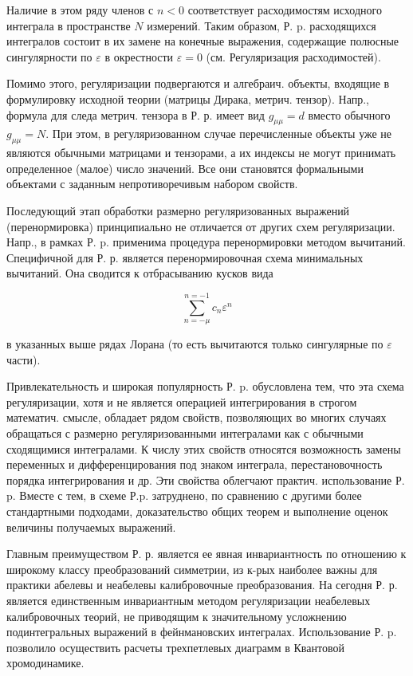 \documentclass[10pt]{article}
\begin{document}
Наличие в этом ряду членов с $n<0$ соответствует расходимостям исходного интеграла в пространстве $N$ измерений. Таким образом, Р. p. расходящихся интегралов состоит в их замене на конечные выражения, содержащие полюсные сингулярности по $\varepsilon$ в окрестности $\varepsilon=0$ (см. Регуляризация расходимостей).



Помимо этого, регуляризации подвергаются и алгебраич. объекты, входящие в формулировку исходной теории (матрицы Дирака, метрич. тензор). Напр., формула для следа метрич. тензора в Р. р. имеет вид $g_{\mu \mu}=d$ вместо обычного $g_{\mu \mu}=N$. При этом, в регуляризованном случае перечисленные объекты уже не являются обычными матрицами и тензорами, а их индексы не могут принимать определенное (малое) число значений. Все они становятся формальными объектами с заданным непротиворечивым набором свойств.



Последующий этап обработки размерно регуляризованных выражений (перенормировка) принципиально не отличается от других схем регуляризации. Напр., в рамках Р. p. применима процедура перенормировки методом вычитаний. Специфичной для Р. р. является перенормировочная схема минимальных вычитаний. Она сводится к отбрасыванию кусков вида



\[

\sum_{n=-\mu}^{n=-1} c_{n} \varepsilon^{n}

\]



в указанных выше рядах Лорана (то есть вычитаются только сингулярные по $\varepsilon$ части).



Привлекательность и широкая популярность Р. p. обусловлена тем, что эта схема регуляризации, хотя и не является операцией интегрирования в строгом математич. смысле, обладает рядом свойств, позволяющих во многих случаях обращаться с размерно регуляризованными интегралами как с обычными сходящимися интегралами. К числу этих свойств относятся возможность замены переменных и дифференцирования под знаком интеграла, перестановочность порядка интегрирования и др. Эти свойства облегчают практич. использование Р. p. Вместе с тем, в схеме Р.p. затруднено, по сравнению с другими более стандартными подходами, доказательство общих теорем и выполнение оценок величины получаемых выражений.



Главным преимуществом Р. р. является ее явная инвариантность по отношению к широкому классу преобразований симметрии, из к-рых наиболее важны для практики абелевы и неабелевы калибровочные преобразования. На сегодня Р. р. является единственным инвариантным методом регуляризации неабелевых калибровочных теорий, не приводящим к значительному усложнению подинтегральных выражений в фейнмановских интегралах. Использование Р. p. позволило осуществить расчеты трехпетлевых диаграмм в Квантовой хромодинамике.
\end{document}
